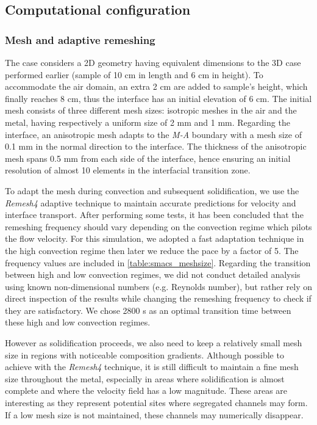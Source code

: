 \subsection{Computational configuration}


\subsubsection{Mesh and adaptive remeshing}

The case considers a 2D geometry having equivalent dimensions to the 3D case performed earlier (sample of 10 cm in length and 6 cm in height).
To accommodate the air domain, an extra 2 cm are added to sample's height, which finally reaches 8 cm, thus the interface has an initial elevation of 6 cm. 
The initial mesh consists of three different mesh sizes: isotropic meshes in the air and the metal, having respectively a uniform size of 2 mm and 1 mm.
Regarding the interface, an anisotropic mesh adapts to the \emph{M-A} boundary with a mesh size of 0.1 mm in the normal direction to the interface.
The thickness of the anisotropic mesh spans 0.5 mm from each side of the interface, hence ensuring an initial resolution of almost 10 elements in the interfacial transition zone.

To adapt the mesh during convection and subsequent solidification, we use the \emph{Remesh4} adaptive technique to maintain accurate predictions for velocity and interface transport.
After performing some tests, it has been concluded that the remeshing
frequency should vary depending on the convection regime which pilots the flow velocity.
For this simulation, we adopted a fast adaptation technique in the high convection regime
then later we reduce the pace by a factor of 5. The frequency values are included in \cref{table:smacs_meshsize}. 
Regarding the transition between high and low convection regimes, we did not conduct detailed analysis using 
known non-dimensional numbers (e.g. Reynolds number), but rather rely on direct inspection of the results while changing the remeshing frequency
to check if they are satisfactory. We chose 2800 s as an optimal transition time between these high and low convection regimes.

However as solidification proceeds, we also need to keep a relatively small mesh size in regions with noticeable composition gradients.
Although possible to achieve with the \emph{Remesh4} technique, it is still difficult to maintain a fine mesh size throughout the metal, especially in areas
where solidification is almost complete and where the velocity field has a low magnitude. These areas are interesting as they represent potential
sites where segregated channels may form. If a low mesh size is not maintained, these channels may numerically disappear. 

